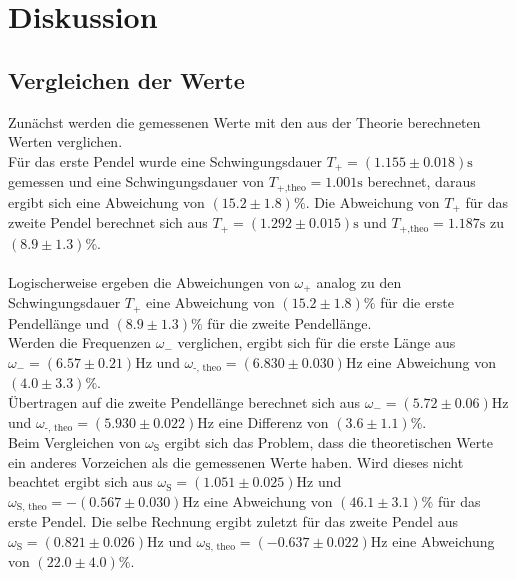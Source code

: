 \section{Diskussion}

    \subsection{Vergleichen der Werte}
    
        \noindent Zunächst werden die gemessenen Werte mit den aus der Theorie berechneten Werten verglichen. \\
        Für das erste Pendel wurde eine 
        Schwingungsdauer $T_+ = (1.155 \pm 0.018) \si{\s}$ gemessen und eine Schwingungsdauer von $T_{+\text{,theo}} = 1.001 \si{\s}$ berechnet,
        daraus ergibt sich eine Abweichung von $(15.2 \pm 1.8) \%$.
        Die Abweichung von $T_+$ für das zweite Pendel berechnet sich aus $T_+ = (1.292 \pm 0.015) \si{\s}$ und 
        $T_{+\text{,theo}} = 1.187 \si{\s}$ zu $(8.9 \pm 1.3) \%$.\\\\
        Logischerweise ergeben die Abweichungen von $\omega_+$ analog zu den Schwingungsdauer $T_+$ eine Abweichung von $(15.2 \pm 1.8) \%$ 
        für die erste Pendellänge und $(8.9 \pm 1.3) \%$ für die zweite Pendellänge.\\
        Werden die Frequenzen $\omega_-$ verglichen, ergibt sich für die erste Länge aus $\omega_{-} = (6.57 \pm 0.21) \si{\hertz}$ und
        $\omega_\text{-, theo} = (6.830 \pm 0.030 )\si{\hertz}$ eine Abweichung von $ (4.0 \pm 3.3) \%$. \\
        Übertragen auf die zweite Pendellänge berechnet sich aus  $\omega_{-} = (5.72 \pm 0.06) \si{\hertz}$ und 
        $\omega_\text{-, theo} = (5.930 \pm 0.022) \si{\hertz}$ eine Differenz von $ (3.6 \pm 1.1) \%$.\\
        Beim Vergleichen von $\omega_{\text{S}}$ ergibt sich das Problem, dass die theoretischen Werte ein anderes Vorzeichen als die gemessenen 
        Werte haben. Wird dieses nicht beachtet ergibt sich aus $\omega_{\text{S}}= (1.051 \pm 0.025 )\si{\hertz}$ und 
        $\omega_\text{S, theo} = -(0.567 \pm 0.030) \si{\hertz}$ eine Abweichung von $(46.1 \pm 3.1) \%$ für das erste Pendel.
        Die selbe Rechnung ergibt zuletzt für das zweite Pendel aus $ \omega_{\text{S}}= (0.821 \pm 0.026) \si{\hertz}$ und 
        $\omega_\text{S, theo} = (-0.637 \pm 0.022 )\si{\hertz}$ eine Abweichung von $ (22.0 \pm 4.0) \%$.
       
